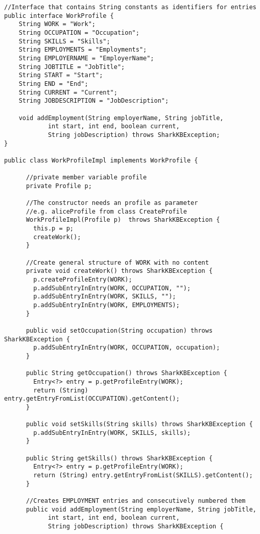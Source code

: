 \documentclass[12pt]{article}
\begin{document}
\begin{verbatim}
//Interface that contains String constants as identifiers for entries
public interface WorkProfile {
    String WORK = "Work";
    String OCCUPATION = "Occupation";
    String SKILLS = "Skills";
    String EMPLOYMENTS = "Employments";
    String EMPLOYERNAME = "EmployerName";
    String JOBTITLE = "JobTitle";
    String START = "Start";
    String END = "End";
    String CURRENT = "Current";
    String JOBDESCRIPTION = "JobDescription";
    
    void addEmployment(String employerName, String jobTitle,
            int start, int end, boolean current,
            String jobDescription) throws SharkKBException;
}

public class WorkProfileImpl implements WorkProfile {
	
      //private member variable profile
      private Profile p;

      //The constructor needs an profile as parameter
      //e.g. aliceProfile from class CreateProfile
      WorkProfileImpl(Profile p)  throws SharkKBException {
        this.p = p;
        createWork();
      }

      //Create general structure of WORK with no content
      private void createWork() throws SharkKBException {
        p.createProfileEntry(WORK);
        p.addSubEntryInEntry(WORK, OCCUPATION, "");
        p.addSubEntryInEntry(WORK, SKILLS, "");
        p.addSubEntryInEntry(WORK, EMPLOYMENTS);
      }

      public void setOccupation(String occupation) throws SharkKBException {
        p.addSubEntryInEntry(WORK, OCCUPATION, occupation);
      }

      public String getOccupation() throws SharkKBException {
        Entry<?> entry = p.getProfileEntry(WORK);
        return (String) entry.getEntryFromList(OCCUPATION).getContent();
      }

      public void setSkills(String skills) throws SharkKBException {
        p.addSubEntryInEntry(WORK, SKILLS, skills);
      }

      public String getSkills() throws SharkKBException {
        Entry<?> entry = p.getProfileEntry(WORK);
        return (String) entry.getEntryFromList(SKILLS).getContent();
      }

      //Creates EMPLOYMENT entries and consecutively numbered them
      public void addEmployment(String employerName, String jobTitle,
            int start, int end, boolean current,
            String jobDescription) throws SharkKBException {


\end{verbatim}
\end{document}
